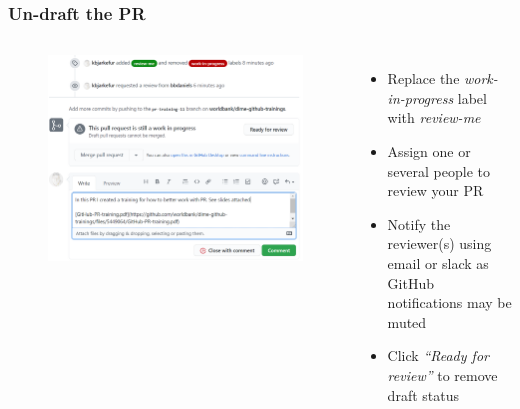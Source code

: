 \documentclass[aspectratio=169]{beamer} %
\begin{document}
\begin{frame}
	\frametitle{Un-draft the PR}
	\begin{columns}[c]
		
		\vspace{-.75cm}
		\begin{figure}
			\centering
			\includegraphics[width=\textwidth]{./img/undraft-pr.png}
		\end{figure}
		
		\begin{itemize}
			\setlength\itemsep{1em}
			\item Replace the \textit{work-in-progress} label
			with \textit{review-me}
			\item Assign one or several people to review your PR
			\item Notify the reviewer(s) using email
			or slack as GitHub notifications may be muted
			\item Click \textit{``Ready for review''} to remove draft status
		\end{itemize}
		
	\end{columns}
\end{frame}
\end{document}
